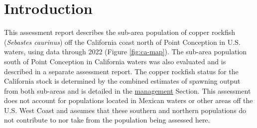 \documentclass[11pt,
  letterpaper,
]{article}
\begin{document}
\newpage
\thispagestyle{empty} %

\pagestyle{plain}  %
\renewcommand*{\thefootnote}{\arabic{footnote}}  %
\setcounter{footnote}{0}  %
\renewcommand{\headrulewidth}{0.5pt}
\renewcommand{\footrulewidth}{0.5pt}

\newcommand{\lt}{\ensuremath <}
\newcommand{\gt}{\ensuremath >}

\newcommand\CapeM{$40^\circ 10^\prime$ N. lat.}
\newcommand\PtC{$34^\circ 27^\prime$ N. lat.}
\newcommand\CAOR{$42^\circ 00^\prime$ N. lat.}

\pagebreak
{}
\setcounter{page}{1}

\renewcommand{\thetable}{\roman{table}}
\renewcommand{\thefigure}{\roman{figure}}

\setlength\parskip{0.5em plus 0.1em minus 0.2em}

\vspace{500cm}

\pagebreak

\pagebreak
\setlength{\parskip}{5mm plus1mm minus1mm}
\setcounter{page}{1}
\renewcommand{\thefigure}{\arabic{figure}}
\renewcommand{\thetable}{\arabic{table}}
\setcounter{table}{0}
\setcounter{figure}{0}

\section{Introduction}\label{introduction}

This assessment report describes the sub-area population of copper rockfish (\emph{Sebastes caurinus}) off the California coast north of Point Conception in U.S. waters, using data through 2022 (Figure \ref{fig:ca-map}). The sub-area population south of Point Conception in California waters was also evaluated and is described in a separate assessment report. The copper rockfish status for the California stock is determined by the combined estimates of spawning output from both sub-areas and is detailed in the \hyperref[management]{management} Section. This assessment does not account for populations located in Mexican waters or other areas off the U.S. West Coast and assumes that these southern and northern populations do not contribute to nor take from the population being assessed here.
\end{document}
